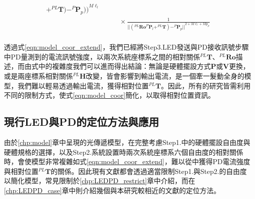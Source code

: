 \begin{equation}
\begin{aligned}
{                                                +^{PL}\boldsymbol{T}
                                            )
                                            - ^{P}\boldsymbol{P}_p
                                        )
                                    )
                                }^{M\ell_{l}}   \\
                        & \qquad \times
                            \frac{     
                                1   
                            } 
                            {
                                {
                                    ||
                                        (^{PL}\boldsymbol{Ro}^{P}\boldsymbol{P}_l+^{PL}\boldsymbol{T})
                                        - ^{P}\boldsymbol{P}_p
                                    ||
                                }^{2+M\ell_l+Mp_p}
                            }\\
                    \end{aligned}
                \end{equation}
    
    
    
            
        透過式\ref{eqn:model_coor_extend}，我們已經將Step3.LED發送與PD接收訊號步驟中PD量測到的電流訊號強度，以兩次系統座標系之間的相對關係$^{PL}\boldsymbol{T}$、$^{PL}\boldsymbol{Ro}$描述，而由式中的複雜度我們可以進而得出結論：無論是硬體擺設方式$\boldsymbol{P}$或$\boldsymbol{V}$更換，或是兩座標系相對關係$^{PL}\boldsymbol{H}$改變，皆會影響到輸出電流，是一個牽一髮動全身的模型，我們難以輕易透過輸出電流，獲得相對位置$^{PL}\boldsymbol{T}$。因此，所有的研究皆需利用不同的限制方式，使式\ref{eqn:model_coor}簡化，以取得相對位置資訊。
    
    
    
    
    
        
        


\subsection{現行LED與PD的定位方法與應用}
\label{chp:LEDPD_now}
            


由於\ref{chp:model}章中呈現的光傳遞模型，在完整考慮Step1.中的硬體擺設自由度與硬體規格的選擇，以及Step2.系統設置時兩次系統座標系六個自由度的相對關係時，會使模型非常複雜如式\ref{eqn:model_coor_extend}，難以從中獲得PD電流強度與相對位置$^{PL}\boldsymbol{T}$的關係。因此現有文獻都會透過適當限制Step1.與Step2.的自由度以簡化模型，常見限制於\ref{chp:LEDPD_restrict}章中介紹，而在\ref{chp:LEDPD_case}章中則介紹幾個與本研究較相近的文獻的定位方法。

